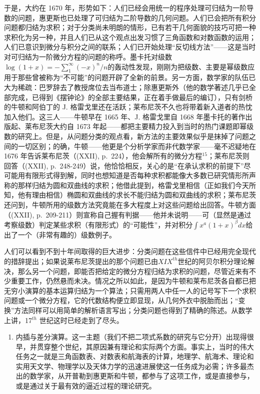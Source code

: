 于是，大约在 1670 年，形势如下：人们已经会用统一的程序处理可归结为一阶导数的问题，惠更斯也已处理了可归结为二阶导数的几何问题。人们已会把所有积分问题都归结为求积；对于分类尚未明朗的情形，已有若干几何面貌的技巧可把一种求积化为另一种，并且人们已从这个观点出发习惯了三角函数和对数函数的运用；人们已意识到微分与积分之间的联系；人们已开始处理“反切线方法”——这是当时对可归结为一阶微分方程的问题的称呼。墨卡托对级数\(\log(1+x)=-\sum_{1}^{\infty}(-x)^{n}/n\)的轰动性发现，刚刚为把级数、主要是幂级数应用于那些曾被称为“不可能”的问题开辟了全新的前景。另一方面，数学家的队伍已大为稀疏：巴罗辞去了教授席位去当布道士；除惠更斯外（他的数学著述几乎已全部完成，已得到《摆钟论》的全部主要结果，正在着手做最后的编订），只有剑桥的牛顿和阿伯丁的 J. 格雷戈里还在活跃；莱布尼茨不久也将带着新入道者的热忱加入他们。这三人——牛顿早在 1665 年、J. 格雷戈里自 1668 年墨卡托的著作出版起、莱布尼茨大约自 1673 年起——都把主要精力投入到当时的热门课题即幂级数的研究上。但是，从问题分类的观点看，新方法的主要效果似乎是抹掉了问题之间的一切区别；的确，牛顿——他更是个分析学家而非代数学家——毫不迟疑地在 1676 年告诉莱布尼茨（(XXII), p.~224），他会解所有的微分方程\({}^{15}\)；莱布尼茨则回答（(XXII), p.~248-249）说，他恰恰相反，关心的是“在承认求积的前提下”尽可能用有限形式得到解，同时也想知道是否每种求积都能像大多数已研究情形所声称的那样归结为圆和双曲线的求积；他借此提到，格雷戈里相信（正如我们今天所知，他有理由相信）椭圆和双曲线的求长不能归结为圆和双曲线的求积；莱布尼茨还问到，牛顿所用的级数方法究竟能在多大程度上对这些问题给出回答。牛顿方面（(XXII), p.~209-211）则宣称自己握有判据——他并未说明——可（显然是通过考察级数）判定某些求积（有限形式）的“可能性”，并对积分\(\int x^{a}(1+x)^{\beta}dx\)给出了一个（非常有趣的）级数例子。

人们可以看到不到十年间取得的巨大进步：分类问题在这些信件中已经用完全现代的措辞提出；如果说莱布尼茨提出的那个问题已由\(XIX^{th}\)世纪的阿贝尔积分理论解决，那么另一个问题，即能否把给定的微分方程归结为求积的问题，尽管近来有不少重要工作，仍然悬而未决。情况之所以如此，是因为牛顿和莱布尼茨各自都已把无穷小演算的基本运算归结为一个算法；只需用两人中任一人的记号写下一个求积问题或一个微分方程，它的代数结构便立即显现，从几何外衣中脱胎而出；“变换”方法同样可以用简单的解析语言写出；分类问题也得到了精确的陈述。从数学上讲，17\(^{th}\) 世纪这时已经走到了尽头。

\begin{enumerate}
\def\labelenumi{\Alph{enumi})}
\setcounter{enumi}{4}
\tightlist
\item
  内插与差分演算。这一主题（我们不把二项式系数的研究与它分开）出现得很早，并贯穿整个世纪，其原因兼有理论和实际两个方面。事实上，当时的伟大任务之一就是三角函数表、对数表和航海表的计算，地理学、航海术、理论和实用天文学、物理学以及天体力学的迅速进展使这一任务成为必需；许多最杰出的数学家，从开普勒到惠更斯和牛顿，都参与了这项工作，或是直接参与，或是通过关于最有效的逼近过程的理论研究。
\end{enumerate}

